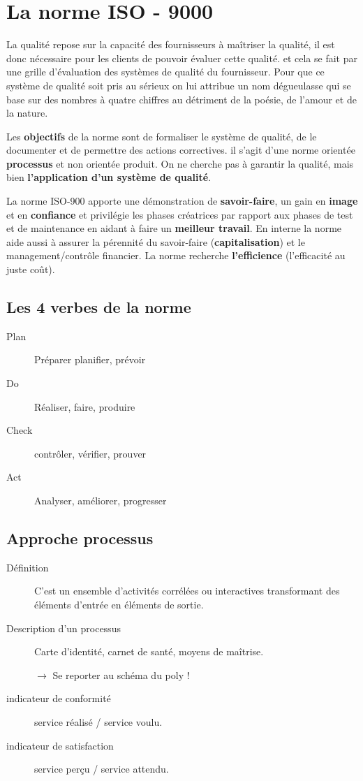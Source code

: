\chapter{La norme ISO - 9000}

La qualité repose sur la capacité des fournisseurs à maîtriser la qualité, il est donc nécessaire pour les clients de pouvoir évaluer cette qualité. et cela se fait par une grille d’évaluation des systèmes de qualité du fournisseur. Pour que ce système de qualité soit pris au sérieux on lui attribue un nom dégueulasse qui se base sur des nombres à quatre chiffres au détriment de la poésie, de l’amour et de la nature. %

Les \textbf{objectifs} de la norme sont de formaliser le système de qualité, de le documenter et de permettre des actions correctives. il s’agit d’une norme orientée \textbf{processus} et non orientée produit. On ne cherche pas à garantir la qualité, mais bien \textbf{l’application d’un système de qualité}.

La norme ISO-900 apporte une démonstration de \textbf{savoir-faire}, un gain en \textbf{image} et en \textbf{confiance} et privilégie les phases créatrices par rapport aux phases de test et de maintenance en aidant à faire un \textbf{meilleur travail}. En interne la norme aide aussi à assurer la pérennité du savoir-faire (\textbf{capitalisation}) et le management/contrôle financier. La norme recherche \textbf{l'efficience} (l'efficacité au juste coût).

\section{Les 4 verbes de la norme}
\begin{description}
	\item[Plan] Préparer planifier, prévoir
	\item[Do] Réaliser, faire, produire
	\item[Check] contrôler, vérifier, prouver
	\item[Act] Analyser, améliorer, progresser
\end{description}



\section{Approche processus}
\begin{description}
	\item[Définition] C’est un ensemble d'activités corrélées ou interactives transformant des éléments d'entrée en éléments de sortie.
	\item[Description d’un processus] Carte d'identité, carnet de santé, moyens de maîtrise.

$\rightarrow$ Se reporter au schéma du poly !

\item[indicateur de conformité] service réalisé / service voulu.
\item[indicateur de satisfaction] service perçu / service attendu.
\end{description}

